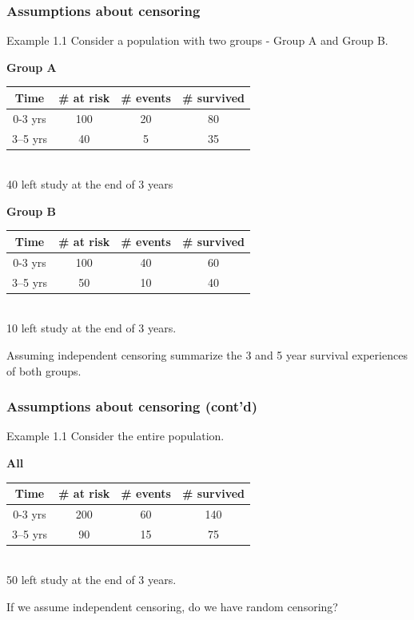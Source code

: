 \documentclass{beamer}
\theoremstyle{definition}
\begin{document}
\begin{frame}
\frametitle{Assumptions about censoring}
\begin{block}{Example 1.1}
Consider a population with two groups - Group A and Group B.
\begin{center}
\textbf{Group A}
\begin{tabular}{ c c c c }
 Time & \# at risk & \# events & \# survived \\ \hline
 0-3 yrs & 100 & 20 & 80 \\
 3–5 yrs &  40 & 5 & 35
\end{tabular} \\
40 left study at the end of 3 years
\end{center}
\begin{center}
\textbf{Group B}
\begin{tabular}{ c c c c }
 Time & \# at risk & \# events & \# survived \\ \hline
 0-3 yrs & 100 & 40 & 60 \\
 3–5 yrs &  50 & 10 & 40
\end{tabular} \\
10 left study at the end of 3 years.
\end{center}
\end{block}
Assuming independent censoring summarize the 3 and 5 year survival experiences of both groups.
\end{frame}

\begin{frame}
\frametitle{Assumptions about censoring (cont'd)}
\begin{block}{Example 1.1}
Consider the entire population.
\begin{center}
\textbf{All}
\begin{tabular}{ c c c c }
 Time & \# at risk & \# events & \# survived \\ \hline
 0-3 yrs & 200 & 60 & 140 \\
 3–5 yrs &  90 & 15 & 75
\end{tabular} \\
50 left study at the end of 3 years.
\end{center}
\end{block}
If we assume independent censoring, do we have random censoring?
\end{frame}
\end{document}
